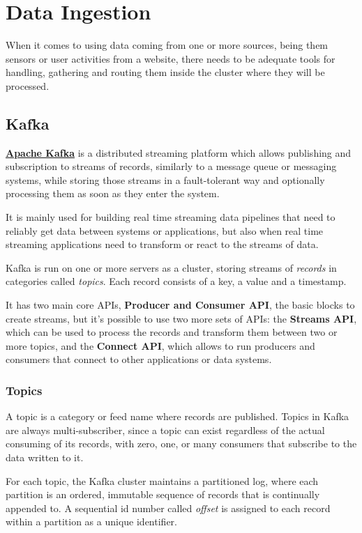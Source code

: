 \chapter{Data Ingestion}

When it comes to using data coming from one or more sources, being them sensors or user activities from a website, there needs to be adequate tools for handling, gathering and routing them inside the cluster where they will be processed.

\section{Kafka}

\textbf{\href{https://kafka.apache.org}{Apache Kafka}} \cite{kafka_doc} is a distributed streaming platform which allows publishing and subscription to streams of records, similarly to a message queue or messaging systems, while storing those streams in a fault-tolerant way and optionally processing them as soon as they enter the system. 

It is mainly used for building real time streaming data pipelines that need to reliably get data between systems or applications, but also when real time streaming applications need to transform or react to the streams of data.

Kafka is run on one or more servers as a cluster, storing streams of \textit{records} in categories called \textit{topics}. Each record consists of a key, a value and a timestamp.

It has two main core APIs, \textbf{Producer and Consumer API}, the basic blocks to create streams, but it's possible to use two more sets of APIs: the \textbf{Streams API}, which can be used to process the records and transform them between two or more topics, and the \textbf{Connect API}, which allows to run producers and consumers that connect to other applications or data systems.

\subsection{Topics}

A topic is a category or feed name where records are published. Topics in Kafka are always multi-subscriber, since a topic can exist regardless of the actual consuming of its records, with zero, one, or many consumers that subscribe to the data written to it.

For each topic, the Kafka cluster maintains a partitioned log, where each partition is an ordered, immutable sequence of records that is continually appended to. A sequential id number called \textit{offset} is assigned to each record within a partition as a unique identifier.

